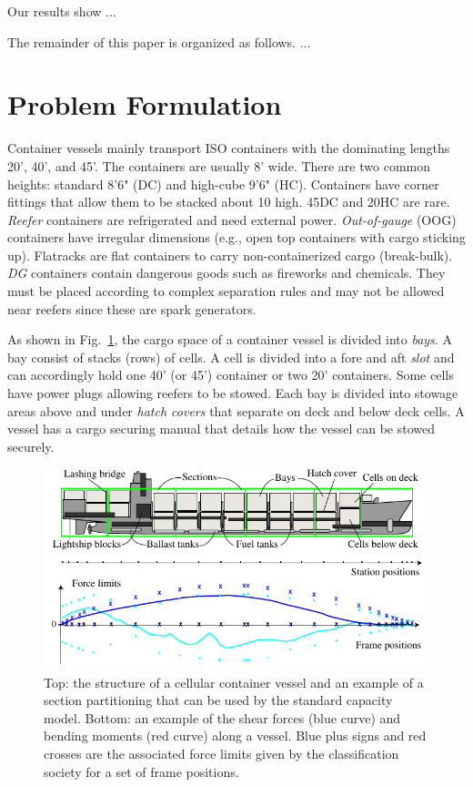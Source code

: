 \documentclass[runningheads]{llncs}
\begin{document}
Our results show ...

The remainder of this paper is organized as follows. ...

\section{Problem Formulation}

Container vessels mainly transport ISO containers with the dominating lengths 20', 40', and 45'. The containers are usually 8' wide. There are two common heights: standard 8'6" (DC) and high-cube 9'6" (HC). Containers have corner fittings that allow them to be stacked about 10 high. 45DC and 20HC are rare. {\em Reefer} containers are refrigerated and need external power. {\em Out-of-gauge} (OOG) containers have irregular dimensions (e.g., open top containers with cargo sticking up). Flatracks are flat containers to carry non-containerized cargo (break-bulk). {\em DG} containers contain dangerous goods such as fireworks and chemicals. They must be placed according to complex separation rules and may not be allowed near reefers since these are spark generators. 

As shown in Fig.~\ref{fig:vessel}, the cargo space of a container vessel is divided into {\em bays}. A bay consist of stacks (rows) of cells. A cell is divided into a fore and aft \emph{slot} and can accordingly hold one 40' (or 45') container or two 20' containers. Some cells have power plugs allowing reefers to be stowed. Each bay is divided into stowage areas above and under {\em hatch covers} that separate on deck and below deck cells. A vessel has a cargo securing manual that details how the vessel can be stowed securely.    
\begin{figure}[h!]
	\centering
		\includegraphics[scale=1.0]{figures/vesselAndForces.pdf}
	\caption{Top: the structure of a cellular container vessel and an example of a section partitioning that can be used by the standard capacity model. Bottom: an example of the shear forces (blue curve) and bending moments (red curve) along a vessel. Blue plus signs and red crosses are the associated force limits given by the classification society for a set of frame positions.} 
	\label{fig:vessel}
\end{figure}
\end{document}
